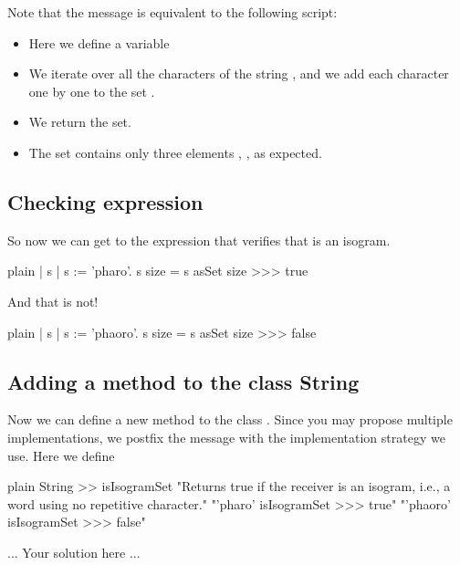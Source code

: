 \documentclass[10pt,twoside,english]{_support/latex/sbabook/sbabook}
\begin{document}
Note that the message  is equivalent to the following script:


\begin{itemize}
\item Here we define a variable 
\item We iterate over all the characters of the string , and we add each character one by one to the set .
\item We return the set.
\item The set contains only three elements , ,  as expected. 
\end{itemize}
\subsection{Checking expression}
So now we can get to the expression that verifies that  is an isogram. 

\begin{displaycode}{plain}
| s | 
s := 'pharo'.
s size = s asSet size 
>>> true
\end{displaycode}

And that  is not!

\begin{displaycode}{plain}
| s | 
s := 'phaoro'.
s size = s asSet size 
>>> false
\end{displaycode}
\subsection{Adding a method to the class String}
Now we can define a new method to the class . Since you may propose multiple implementations, we postfix the message with the implementation strategy we use. Here we define 

\begin{displaycode}{plain}
String >> isIsogramSet
	"Returns true if the receiver is an isogram, i.e., a word using no repetitive character."
	"'pharo' isIsogramSet
	>>> true"
	"'phaoro' isIsogramSet
	>>> false"
	
	... Your solution here ... 
\end{displaycode}
\end{document}
